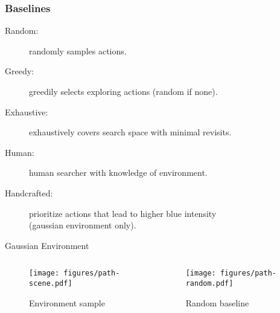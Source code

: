 \begin{frame}
    \frametitle{Baselines}


    \begin{description}
        \item [Random:] randomly samples actions.
        \item [Greedy:] greedily selects exploring actions (random if none).
        \item [Exhaustive:] exhaustively covers search space with minimal revisits.
        \item [Human:] human searcher with knowledge of environment.
        \item[Handcrafted:] prioritize actions that lead to higher blue intensity\\ (gaussian environment only).
    \end{description}
\end{frame}


\begin{frame}
    \begin{table}
        \centering
        Gaussian Environment\par\vspace{0.5em}
        
    \end{table}


    \begin{center}
    \end{center}
\end{frame}

\begin{frame}
    \begin{columns}
        \begin{column}{0.55\textwidth}
            \begin{figure}
                \centering
                \texttt{[image: figures/path-scene.pdf]}
                \par Environment sample
            \end{figure}
        \end{column}
        \begin{column}{0.5\textwidth}
            \begin{figure}
                \centering
                \texttt{[image: figures/path-random.pdf]}
                \par Random baseline
            \end{figure}
        \end{column}
    \end{columns}
\end{frame}

